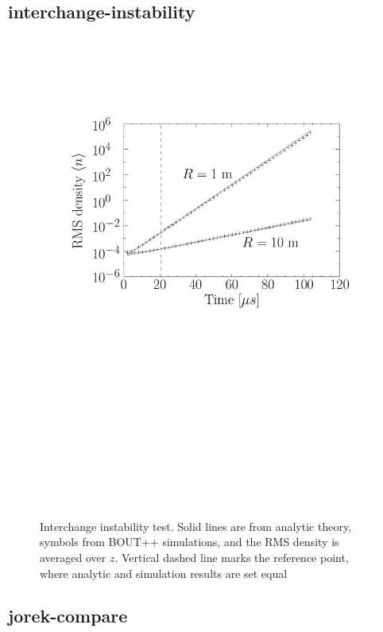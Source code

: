 \documentclass[12pt]{article}
\begin{document}
\subsection{interchange-instability}
%
\begin{figure}[htb!]
\centering \includegraphics[scale=0.4]{figs/interchange_inst_test.pdf}
\caption{Interchange instability test. Solid lines are from analytic theory, symbols from BOUT++ simulations, and the RMS
density is averaged over $z$. Vertical dashed line marks the reference point,
where analytic and simulation results are set equal}
%
\label{fig:profiles}
%
\end{figure}
%



\subsection{jorek-compare}
%
\end{document}
